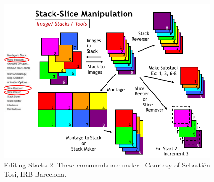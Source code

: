 \begin{figure}[hbtp]
\begin{center}
\includegraphics[width=\textwidth]{fig/stackEditing2.png}
\caption{Editing Stacks 2. These commands are under . Courtesy of Sebasti\'{e}n Tosi, IRB Barcelona.}
\label{fig:editStack2a}
\end{center}
\end{figure}


